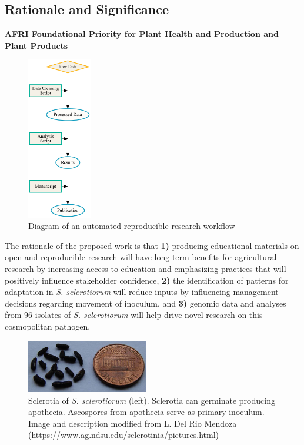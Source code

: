 \documentclass[12pt,letterpaper]{article}
\begin{document}
\subsection{Rationale and Significance}


\noindent
\textbf{AFRI Foundational Priority for Plant Health and Production and Plant Products}
\begin{figure} %
  \includegraphics[width=0.25\textwidth]{figure/rr.pdf}
  \caption{Diagram of an automated reproducible research workflow}
  \label{fig:rr}
\end{figure}

The rationale of the proposed work is that 
\textbf{1)} producing educational materials on open and reproducible research will have long-term benefits for agricultural research by increasing access to education and emphasizing practices that will positively influence stakeholder confidence, 
\textbf{2)} the identification of patterns for adaptation in \textit{S. sclerotiorum} will reduce inputs by influencing management decisions regarding movement of inoculum, and 
\textbf{3)} genomic data and analyses from 96 isolates of \textit{S. sclerotiorum} will help drive novel research on this cosmopolitan pathogen. 

\begin{figure}
  \centering
  \includegraphics[width=0.475\textwidth]{figure/sclerotia.jpg}
  \caption{Sclerotia of \textit{S. sclerotiorum} (left). Sclerotia can germinate producing apothecia. Ascospores from apothecia serve as primary inoculum. Image and description modified from L. Del Rio Mendoza (\url{https://www.ag.ndsu.edu/sclerotinia/pictures.html})}
  \label{fig:sclerotia}
\end{figure}
\end{document}
